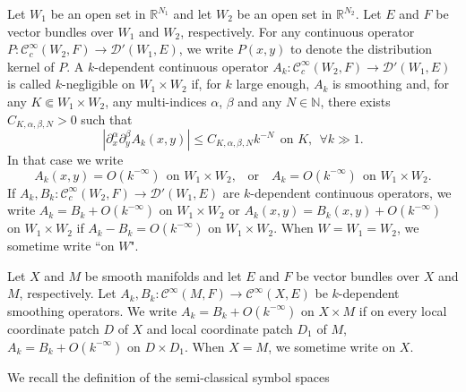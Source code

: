 \documentclass[12pt]{amsart}
\theoremstyle{definition}
\theoremstyle{named}
\numberwithin{equation}{subsection}
\newcommand{\pr}{\partial}
\newcommand{\abs}[1]{\left\vert#1\right\vert}
\newcommand{\To}{\rightarrow}
\def\cC{\mathscr{C}}
\begin{document}
Let $W_1$ be an open set in $\mathbb R^{N_1}$ and let $W_2$ be an open set in $\mathbb R^{N_2}$. Let $E$ and $F$ be vector bundles over $W_1$ and $W_2$, respectively. For any continuous operator $P: \cC^\infty_c(W_2,F)\To\mathcal{D}'(W_1,E)$, we write $P(x,y)$ to denote the distribution kernel of $P$.
A $k$-dependent continuous operator
$A_k: \cC^\infty_c(W_2,F)\To\mathcal{D}'(W_1,E)$ is called $k$-negligible on $W_1\times W_2$
if, for $k$ large enough, $A_k$ is smoothing and, for any $K\Subset W_1\times W_2$, any
multi-indices $\alpha$, $\beta$ and any $N\in\mathbb N$, there exists $C_{K,\alpha,\beta,N}>0$
such that
\[
\abs{\pr^\alpha_x\pr^\beta_yA_k(x, y)}\leq C_{K,\alpha,\beta,N}k^{-N}\:\: \text{on $K$},\ \ \forall k\gg1.
\]
In that case we write
\[A_k(x,y)=O(k^{-\infty})\:\:\text{on $W_1\times W_2$,} \quad
\text{or} \quad
A_k=O(k^{-\infty})\:\:\text{on $W_1\times W_2$.}\]
If $A_k, B_k: \cC^\infty_c(W_2, F)\To\mathcal{D}'(W_1, E)$ are $k$-dependent continuous operators,
we write $A_k= B_k+O(k^{-\infty})$ on $W_1\times W_2$ or $A_k(x,y)=B_k(x,y)+O(k^{-\infty})$ on $W_1\times W_2$ if $A_k-B_k=O(k^{-\infty})$ on $W_1\times W_2$. 
When $W=W_1=W_2$, we sometime write ``on $W$".

Let $X$ and $M$ be smooth manifolds and let $E$ and $F$ be vector bundles over $X$ and $M$, respectively. Let $A_k, B_k: \cC^\infty(M,F)\To\cC^\infty(X,E)$ be $k$-dependent smoothing operators. We write $A_k=B_k+O(k^{-\infty})$ on $X\times M$ if on every local coordinate patch $D$ of $X$ and local coordinate patch $D_1$ of $M$, $A_k=B_k+O(k^{-\infty})$ on $D\times D_1$.
When $X=M$, we sometime write on $X$.

We recall the definition of the semi-classical symbol spaces
\end{document}
